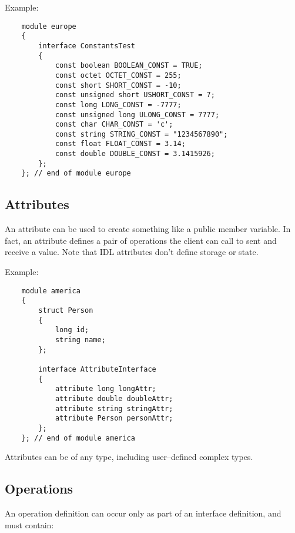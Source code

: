 \vspace{2mm}
Example:
\begin{verbatim}
    module europe
    {
        interface ConstantsTest
        {
            const boolean BOOLEAN_CONST = TRUE;
            const octet OCTET_CONST = 255;
            const short SHORT_CONST = -10;
            const unsigned short USHORT_CONST = 7;
            const long LONG_CONST = -7777;
            const unsigned long ULONG_CONST = 7777;
            const char CHAR_CONST = 'c';
            const string STRING_CONST = "1234567890";  
            const float FLOAT_CONST = 3.14;
            const double DOUBLE_CONST = 3.1415926;        
        };
    }; // end of module europe
\end{verbatim}


\subsection{Attributes}

An attribute can be used to create something like a public member variable.
In fact, an attribute defines a pair of operations the client can call to
sent and receive a value.
Note that IDL attributes don't define storage or state.

\vspace{2mm}
Example:
\begin{verbatim}
    module america
    {
        struct Person 
        {
            long id;
            string name;
        };  
    
        interface AttributeInterface
        {
            attribute long longAttr;
            attribute double doubleAttr;
            attribute string stringAttr;
            attribute Person personAttr;
        };
    }; // end of module america    
\end{verbatim}

Attributes can be of any type, including user--defined complex types.


\subsection{Operations}

An operation definition can occur only as part of an interface definition, and
must contain:

